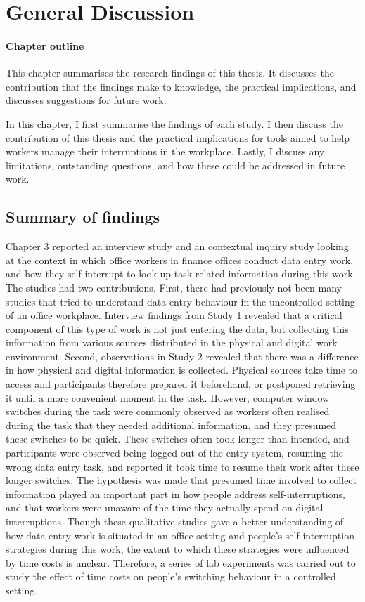 \chapter{General Discussion}

\begin{mynote}
\subsubsection{Chapter outline}
This chapter summarises the research findings of this thesis. It discusses the contribution that the findings make to knowledge, the practical implications, and discusses suggestions for future work.
\end{mynote}

In this chapter, I first summarise the findings of each study. I then discuss the contribution of this thesis and the practical implications for tools aimed to help workers manage their interruptions in the workplace. Lastly, I discuss any limitations, outstanding questions, and how these could be addressed in future work. 

\section{Summary of findings}
Chapter 3 reported an interview study and an contextual inquiry study looking at the context in which office workers in finance offices conduct data entry work, and how they self-interrupt to look up task-related information during this work. The studies had two contributions. First, there had previously not been many studies that tried to understand data entry behaviour in the uncontrolled setting of an office workplace. Interview findings from Study 1 revealed that a critical component of this type of work is not just entering the data, but collecting this information from various sources distributed in the physical and digital work environment. Second, observations in Study 2 revealed that there was a difference in how physical and digital information is collected. Physical sources take time to access and participants therefore prepared it beforehand, or postponed retrieving it until a more convenient moment in the task. However, computer window switches during the task were commonly observed as workers often realised during the task that they needed additional information, and they presumed these switches to be quick. These switches often took longer than intended, and participants were observed being logged out of the entry system, resuming the wrong data entry task, and reported it took time to resume their work after these longer switches. The hypothesis was made that presumed time involved to collect information played an important part in how people address self-interruptions, and that workers were unaware of the time they actually spend on digital interruptions. Though these qualitative studies gave a better understanding of how data entry work is situated in an office setting and people's self-interruption strategies during this work, the extent to which these strategies were influenced by time costs is unclear. Therefore, a series of lab experiments was carried out to study the effect of time costs on people's switching behaviour in a controlled setting.

